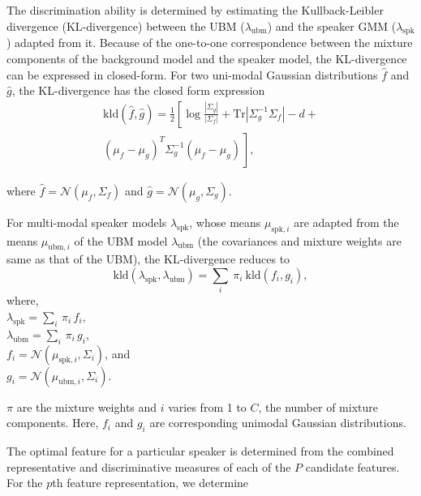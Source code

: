 \documentclass[preprint,12pt,5p]{elsarticle}
\begin{document}
The discrimination ability is determined by estimating the Kullback-Leibler divergence
(KL-divergence) between the UBM ($\lambda_{\textrm{ubm}}$) and the speaker GMM ($\lambda_{\textrm{spk}}$)
adapted from it. Because of the one-to-one
correspondence between the mixture components of the background model and the speaker model, 
the KL-divergence can be expressed in closed-form. For two uni-modal Gaussian distributions
$\hat{f}$ and $\hat{g}$, the KL-divergence has the closed form expression
\begin{equation}
\begin{split}
\textrm{kld}(\hat{f},\hat{g}) = \frac{1}{2}\left[ \log \frac{|\Sigma_g|}{|\Sigma_f|} +
	\textrm{Tr}|\Sigma^{-1}_g\Sigma_f| - d + \right. \\ 
\left. (\mu_f-\mu_g)^T\Sigma_g^{-1}(\mu_f-\mu_g) \frac{}{} \right], 
\end{split}
\label{eq:kldGaussians}
\end{equation}

where $\hat{f} = \mathcal{N}(\mu_f,\Sigma_f)$ and $\hat{g} = \mathcal{N}(\mu_g,\Sigma_g)$.

For multi-modal speaker models $\lambda_{\textrm{spk}}$, whose means
$\mu_{\textrm{spk},i}$ are adapted from the means $\mu_{\textrm{ubm},i}$ of the UBM
model $\lambda_{\textrm{ubm}}$ (the covariances and mixture weights are same as
that of the UBM), the KL-divergence reduces to 
\begin{equation}
\textrm{kld}(\lambda_{\textrm{spk}},\lambda_{\textrm{ubm}}) = 
	\displaystyle \sum_i\ \pi_i\ \textrm{kld}(f_i,g_i),
\label{eq:gmmAdaptedKLD}
\end{equation}
where, \\
$\lambda_{\textrm{spk}} = \displaystyle \sum_i \, \pi_i \, f_i$, \\
$\lambda_{\textrm{ubm}} = \displaystyle\sum_i \, \pi_i \, g_i$, \\
$f_i = \mathcal{N}(\mu_{\textrm{spk},i},\Sigma_i)$, and \\
$g_i = \mathcal{N}(\mu_{\textrm{ubm},i},\Sigma_i)$.

\noindent $\pi$ are the mixture weights and
$i$ varies from 1 to $C$, the number of mixture components. Here, $f_i$ and $g_i$ are
corresponding unimodal Gaussian distributions.


The optimal feature for a particular speaker is determined from the combined
representative and discriminative measures of each of the $P$ candidate
features. For the $p$th feature representation, we determine
\end{document}
